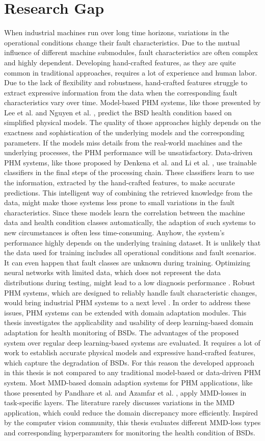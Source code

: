 \section{Research Gap}
When industrial machines run over long time horizons, variations in the operational conditions change their fault characteristics. Due to the mutual influence of different machine submodules, fault characteristics are often complex and highly dependent. Developing hand-crafted features, as they are quite common in traditional approaches, requires a lot of experience and human labor. Due to the lack of flexibility and robustness, hand-crafted features struggle to extract expressive information from the data when the corresponding fault characteristics vary over time. Model-based PHM systems, like those presented by Lee et al. \cite{Lee2015} and Nguyen et al. \cite{NGUYEN2019},  predict the BSD health condition based on simplified physical models. The quality of those approaches highly depends on the exactness and sophistication of the underlying models and the corresponding parameters. If the models miss details from the real-world machines and the underlying processes, the PHM performance will be unsatisfactory. Data-driven PHM systems, like those proposed by Denkena et al. \cite{Denkena2021} and Li et al. \cite{LiPin2018}, use trainable classifiers in the final steps of the processing chain. These classifiers learn to use the information, extracted by the hand-crafted features, to make accurate predictions. This intelligent way of combining the retrieved knowledge from the data, might make those systems less prone to small variations in the fault characteristics. Since these models learn the correlation between the machine data and health condition classes automatically, the adaption of such systems to new circumstances is often less time-consuming. Anyhow, the system's performance highly depends on the underlying training dataset. It is unlikely that the data used for training includes all operational conditions and fault scenarios. It can even happen that fault classes are unknown during training. Optimizing neural networks with limited data, which does not represent the data distributions during testing, might lead to a low diagnosis performance \cite{AZAMFAR2020103932}. Robust PHM systems, which are designed to reliably handle fault characteristic changes, would bring industrial PHM systems to a next level \cite{Michau2017}. In order to address these issues, PHM systems can be extended with domain adaptation modules. This thesis investigates the applicability and usability of deep learning-based domain adaptation for health monitoring of BSDs. The advantages of the proposed system over regular deep learning-based systems are evaluated. It requires a lot of work to establish accurate physical models and expressive hand-crafted features, which capture the degradation of BSDs. For this reason the developed approach in this thesis is not compared to any traditional model-based or data-driven PHM system. Most MMD-based domain adaption systems for PHM applications, like those presented by Pandhare et al. \cite{Pandhare2021} and Azamfar et al. \cite{AZAMFAR2020103932}, apply MMD-losses in task-specific layers. The literature rarely discusses variations in the MMD application, which could reduce the domain discrepancy more efficiently. Inspired by the computer vision community, this thesis evaluates different MMD-loss types and corresponding hyperparamters for monitoring the health condition of BSDs.